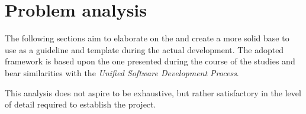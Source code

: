 \chapter{Problem analysis}

The following sections aim to elaborate on the  and create a more solid base to use as a guideline and template during the actual development.
The adopted framework is based upon the one presented during the course of the studies \cite{up} and bear similarities with the \emph{Unified Software Development Process}.

This analysis does not aspire to be exhaustive, but rather satisfactory in the level of detail required to establish the project.








